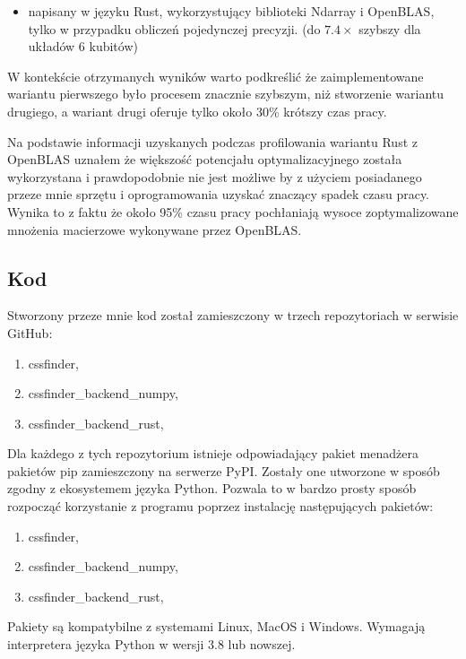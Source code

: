 \documentclass[11pt, a4paper]{article}
\begin{document}
\begin{sloppypar}
\begin{itemize}
      \item napisany w języku Rust, wykorzystujący biblioteki Ndarray i OpenBLAS, tylko w
        przypadku obliczeń pojedynczej precyzji. (do $7.4\times$ szybszy dla układów 6 kubitów)
    \end{itemize}
    W kontekście otrzymanych wyników warto podkreślić że zaimplementowane wariantu
    pierwszego było procesem znacznie szybszym, niż stworzenie wariantu drugiego, a
    wariant drugi oferuje tylko około 30\% krótszy czas pracy.

    Na podstawie informacji uzyskanych podczas profilowania wariantu Rust z OpenBLAS uznałem
    że większość potencjału optymalizacyjnego została wykorzystana i prawdopodobnie nie jest
    możliwe by z użyciem posiadanego przeze mnie sprzętu i oprogramowania uzyskać znaczący
    spadek czasu pracy. Wynika to z faktu że około 95\% czasu pracy pochłaniają wysoce zoptymalizowane
    mnożenia macierzowe wykonywane przez OpenBLAS.

    \subsection{Kod}
    Stworzony przeze mnie kod został zamieszczony w trzech repozytoriach w serwisie GitHub:
    \begin{enumerate}
      \item cssfinder\cite{CSSFinder_New},

      \item cssfinder\_backend\_numpy\cite{CSSFinder_New_Numpy},

      \item cssfinder\_backend\_rust\cite{CSSFinder_New_Rust},
    \end{enumerate}

    Dla każdego z tych repozytorium istnieje odpowiadający pakiet menadżera pakietów pip
    zamieszczony na serwerze PyPI. Zostały one utworzone w sposób zgodny z ekosystemem
    języka Python. Pozwala to w bardzo prosty sposób rozpocząć korzystanie z programu poprzez
    instalację następujących pakietów:
    \begin{enumerate}
      \item cssfinder\cite{CSSFinder_New_PyPI},

      \item cssfinder\_backend\_numpy\cite{CSSFinder_New_Numpy_PyPI},

      \item cssfinder\_backend\_rust\cite{CSSFinder_New_Rust_PyPI},
    \end{enumerate}

    Pakiety są kompatybilne z systemami Linux, MacOS i Windows. Wymagają interpretera języka
    Python w wersji 3.8 lub nowszej.
  \end{sloppypar}
  \newpage
  \begin{sloppypar}
    \medskip


    \printbibliography
    [heading=bibintoc, title={Odwołania}]
  \end{sloppypar}
\end{document}
